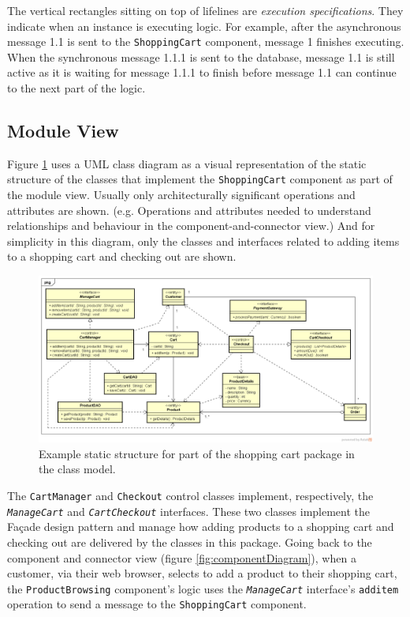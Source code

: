 The vertical rectangles sitting on top of lifelines are \emph{execution specifications}.
They indicate when an instance is executing logic.
For example, after the asynchronous message 1.1 is sent to the \texttt{ShoppingCart} component,
message 1 finishes executing.
When the synchronous message 1.1.1 is sent to the database, message 1.1 is still active
as it is waiting for message 1.1.1 to finish before message 1.1 can continue to the next part of the logic.

\subsection{Module View}\label{sec_moduleView}
Figure \ref{fig:classDiagram} uses a UML class diagram as a visual representation of the static structure
of the classes that implement the \texttt{ShoppingCart} component as part of the module view.
Usually only architecturally significant operations and attributes are shown.
(e.g. Operations and attributes needed to understand relationships and behaviour in the component-and-connector view.)
And for simplicity in this diagram, only the classes and interfaces related to adding items to a shopping cart and checking out are shown.

\begin{figure}[h]
    \centering
    \begin{adjustwidth}{-10.5mm}{-11mm}
        \includegraphics[trim=22 45 22 44,clip,width=0.98\paperwidth]{images/uml/shopping_cart_class_diagram.png}
    \end{adjustwidth}
    \caption{Example static structure for part of the shopping cart package in the class model.}
    \label{fig:classDiagram}
\end{figure}

\noindent
The \texttt{CartManager} and \texttt{Checkout} control classes implement, respectively,
the \texttt{\textsl{ManageCart}} and \texttt{\textsl{Cart\-Check\-out}} interfaces.
These two classes implement the Façade design pattern and manage how
adding products to a shopping cart and checking out are delivered by the classes in this package.
Going back to the component and connector view (figure \ref{fig:componentDiagram}),
when a customer, via their web browser, selects to add a product to their shopping cart,
the \texttt{ProductBrowsing} component's logic uses the \texttt{\textsl{ManageCart}}
interface's \texttt{additem} operation to send a message to the \texttt{ShoppingCart} component.

